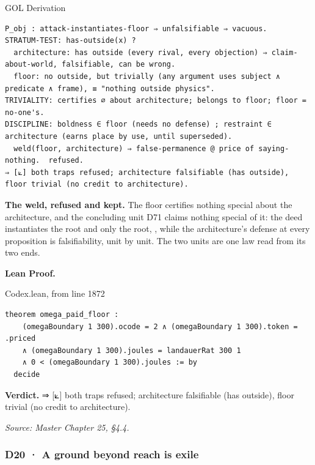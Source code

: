 \documentclass[10pt,twocolumn]{article}
\begin{document}
\begin{golbox}{GOL Derivation}
\begin{lstlisting}[style=golv]
P_obj : attack-instantiates-floor ⇒ unfalsifiable ⇒ vacuous.
STRATUM-TEST: has-outside(x) ?
  architecture: has outside (every rival, every objection) ⇒ claim-about-world, falsifiable, can be wrong.
  floor: no outside, but trivially (any argument uses subject ∧ predicate ∧ frame), ≡ "nothing outside physics".
TRIVIALITY: certifies ∅ about architecture; belongs to floor; floor = no-one's.
DISCIPLINE: boldness ∈ floor (needs no defense) ; restraint ∈ architecture (earns place by use, until superseded).
  weld(floor, architecture) ⇒ false-permanence @ price of saying-nothing.  refused.
⇒ [⟀] both traps refused; architecture falsifiable (has outside), floor trivial (no credit to architecture).
\end{lstlisting}
\end{golbox}

\textbf{The weld, refused and kept.} The floor certifies nothing special
about the architecture, and the concluding unit D71 claims nothing
special of it: the deed instantiates the root and only the root,
\texttt{}, while the
architecture's defense at every proposition is falsifiability, unit by
unit. The two units are one law read from its two ends.

\textbf{Lean Proof.}

\begin{leanexcerpt}{Codex.lean, from line 1872}
\begin{lstlisting}[style=leanx,firstnumber=1872]
theorem omega_paid_floor :
    (omegaBoundary 1 300).ocode = 2 ∧ (omegaBoundary 1 300).token = .priced
    ∧ (omegaBoundary 1 300).joules = landauerRat 300 1
    ∧ 0 < (omegaBoundary 1 300).joules := by
  decide
\end{lstlisting}
\end{leanexcerpt}

\textbf{Verdict.} ⇒ {[}⟀{]} both traps refused; architecture falsifiable
(has outside), floor trivial (no credit to architecture).

\emph{Source: Master Chapter 25, §4.4.}

\hypertarget{d20-a-ground-beyond-reach-is-exile}{%
\subsubsection{D20 · A ground beyond reach is
exile}\label{d20-a-ground-beyond-reach-is-exile}}
\end{document}
